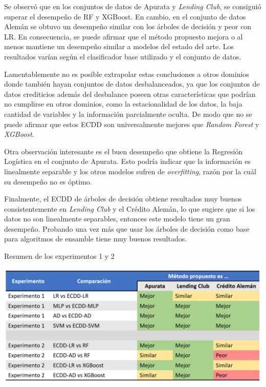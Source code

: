 Se observó que en los conjuntos de datos de Apurata y \textit{Lending Club}, se consiguió superar el desempeño de \ac{RF} y \ac{XGBoost}. En cambio, en el conjunto de datos Alemán se obtuvo un desempeño similar con los árboles de decisión y peor con \ac{LR}. En consecuencia, se puede afirmar que el método propuesto mejora o al menos mantiene un desempeño similar a modelos del estado del arte. Los resultados varían según el clasificador base utilizado y el conjunto de datos.

Lamentablemente no es posible extrapolar estas conclusiones a otros dominios donde también hayan conjuntos de datos desbalanceados, ya que los conjuntos de datos crediticios además del desbalance poseen otras características que podrían no cumplirse en otros dominios, como la estacionalidad de los datos, la baja cantidad de variables y la información parcialmente oculta. De modo que no se puede afirmar que estos \ac{ECDD} son universalmente mejores que \textit{Random Forest} y \textit{XGBoost}.

Otra observación interesante es el buen desempeño que obtiene la Regresión Logística en el conjunto de Apurata. Esto podría indicar que la información es linealmente separable y los otros modelos sufren de \textit{overfitting}, razón por la cuál su desempeño no es óptimo.

Finalmente, el \ac{ECDD} de árboles de decisión obtiene resultados muy buenos consistentemente en \textit{Lending Club} y el Crédito Alemán, lo que sugiere que si los datos no son linealmente separables, entonces este modelo tiene un gran desempeño. Probando una vez más que usar los árboles de decisión como base para algoritmos de ensamble tiene muy buenos resultados.

\begin{table}[htbp]
    \centering
    \caption{Resumen de los experimentos 1 y 2}
    \includegraphics[width=\linewidth]{graficos/propios/resumen_experimentos1_2.PNG}
    \label{tab:summary1_2}
\end{table}

